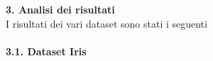 \documentclass{article}
\begin{document}
{\Large \textbf{3. Analisi dei risultati}}\\
I risultati dei vari dataset sono stati i seguenti\\
\\
{\Large \textbf{{\large{3}}.{\small{1}}. Dataset Iris}}\\
\end{document}
